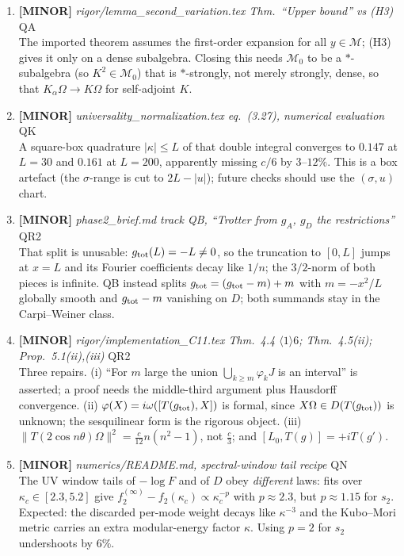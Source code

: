 \documentclass[11pt]{article}
\begin{document}
\begin{enumerate}[leftmargin=1.6em,itemsep=6pt]
\item \textbf{[MINOR]} \emph{rigor/lemma\_second\_variation.tex Thm.~``Upper bound'' vs (H3)} \hfill\textsc{QA}\\ The imported theorem assumes the first-order expansion for all \(y\in\mathcal M\); (H3) gives it only on a dense subalgebra. Closing this needs \(\mathcal M_0\) to be a \(*\)-subalgebra (so \(K^2\in\mathcal M_0\)) that is \(*\)-strongly, not merely strongly, dense, so that \(K_\alpha\Omega\to K\Omega\) for self-adjoint \(K\).
\item \textbf{[MINOR]} \emph{universality\_normalization.tex eq.~(3.27), numerical evaluation} \hfill\textsc{QK}\\ A square-box quadrature \(\lvert\kappa\rvert\le L\) of that double integral converges to \(0.147\) at \(L=30\) and \(0.161\) at \(L=200\), apparently missing \(c/6\) by \(3\)--\(12\%\). This is a box artefact (the \(\sigma\)-range is cut to \(2L-\lvert u\rvert\)); future checks should use the \((\sigma,u)\) chart.
\item \textbf{[MINOR]} \emph{phase2\_brief.md track QB, ``Trotter from \(g_A\), \(g_D\) the restrictions''} \hfill\textsc{QR2}\\ That split is unusable: \(g_{\rm tot}(L)=-L\neq0\), so the truncation to \([0,L]\) jumps at \(x=L\) and its Fourier coefficients decay like \(1/n\); the \(3/2\)-norm of both pieces is infinite. QB instead splits \(g_{\rm tot}=(g_{\rm tot}-m)+m\) with \(m=-x^2/L\) globally smooth and \(g_{\rm tot}-m\) vanishing on \(D\); both summands stay in the Carpi--Weiner class.
\item \textbf{[MINOR]} \emph{rigor/implementation\_C11.tex Thm.~4.4 \(\langle1\rangle6\); Thm.~4.5(ii); Prop.~5.1(ii),(iii)} \hfill\textsc{QR2}\\ Three repairs. (i) ``For \(m\) large the union \(\bigcup_{k\ge m}\varphi_k J\) is an interval'' is asserted; a proof needs the middle-third argument plus Hausdorff convergence. (ii) \(\varphi(X)=i\omega([T(g_{\rm tot}),X])\) is formal, since \(X\Omega\in D(T(g_{\rm tot}))\) is unknown; the sesquilinear form is the rigorous object. (iii) \(\lVert T(2\cos n\theta)\Omega\rVert^2=\frac{c}{12}n(n^2-1)\), not \(\frac{c}{3}\); and \([L_0,T(g)]=+iT(g')\).
\item \textbf{[MINOR]} \emph{numerics/README.md, spectral-window tail recipe} \hfill\textsc{QN}\\ The UV window tails of \(-\log F\) and of \(D\) obey \emph{different} laws: fits over \(\kappa_c\in[2.3,5.2]\) give \(f_2^{(\infty)}-f_2(\kappa_c)\propto\kappa_c^{-p}\) with \(p\approx2.3\), but \(p\approx1.15\) for \(s_2\). Expected: the discarded per-mode weight decays like \(\kappa^{-3}\) and the Kubo--Mori metric carries an extra modular-energy factor \(\kappa\). Using \(p=2\) for \(s_2\) undershoots by \(6\%\).

\end{enumerate}
\end{document}
